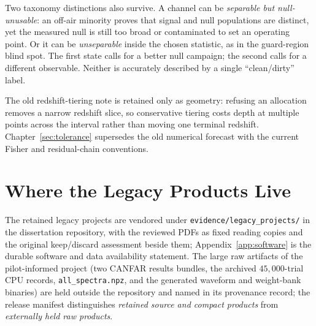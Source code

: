 Two taxonomy distinctions also survive.  A channel can be \emph{separable but
null-unusable}: an off-air minority proves that signal and null populations are
distinct, yet the measured null is still too broad or contaminated to set an
operating point.  Or it can be \emph{unseparable} inside the chosen statistic,
as in the guard-region blind spot.  The first state calls for a better null
campaign; the second calls for a different observable.  Neither is accurately
described by a single ``clean/dirty'' label.

The old redshift-tiering note is retained only as geometry: refusing an
allocation removes a narrow redshift slice, so conservative tiering costs depth
at multiple points across the interval rather than moving one terminal redshift.
Chapter~\ref{sec:tolerance} supersedes the old numerical forecast with the current
Fisher and residual-chain conventions.

\clearpage
\section{Where the Legacy Products Live}

The retained legacy projects are vendored under
\nolinkurl{evidence/legacy_projects/} in the dissertation repository, with the
reviewed PDFs as fixed reading copies and the original keep/discard assessment
beside them; Appendix~\ref{app:software} is the durable software and data
availability statement.  The large raw artifacts of the pilot-informed project
(two CANFAR results bundles, the archived $45{,}000$-trial CPU records,
\texttt{all\_spectra.npz}, and the generated waveform and weight-bank
binaries) are held outside the repository and named in its provenance
record; the release manifest distinguishes \emph{retained source and compact
products} from \emph{externally held raw products}.
